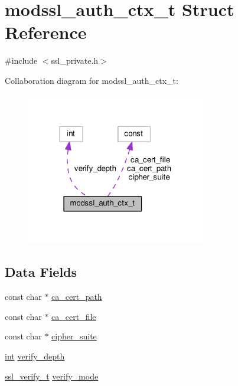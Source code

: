 \hypertarget{structmodssl__auth__ctx__t}{}\section{modssl\+\_\+auth\+\_\+ctx\+\_\+t Struct Reference}
\label{structmodssl__auth__ctx__t}


{\ttfamily \#include $<$ssl\+\_\+private.\+h$>$}



Collaboration diagram for modssl\+\_\+auth\+\_\+ctx\+\_\+t\+:
\nopagebreak
\begin{figure}[H]
\begin{center}
\leavevmode
\includegraphics[width=223pt]{structmodssl__auth__ctx__t__coll__graph}
\end{center}
\end{figure}
\subsection*{Data Fields}
\begin{DoxyCompactItemize}
\item 
const char $\ast$ \hyperlink{structmodssl__auth__ctx__t_ab6907818bc85062a28c931d99f981ca7}{ca\+\_\+cert\+\_\+path}
\item 
const char $\ast$ \hyperlink{structmodssl__auth__ctx__t_aa580f3c2ed5fc2c7d9cf48cf95ef836c}{ca\+\_\+cert\+\_\+file}
\item 
const char $\ast$ \hyperlink{structmodssl__auth__ctx__t_a9cabbc8c6b3b2b002f73b3add389ab96}{cipher\+\_\+suite}
\item 
\hyperlink{pcre_8txt_a42dfa4ff673c82d8efe7144098fbc198}{int} \hyperlink{structmodssl__auth__ctx__t_ab1486d9b2a656743afb44f3fc70401d5}{verify\+\_\+depth}
\item 
\hyperlink{group__MOD__SSL__PRIVATE_ga5473d623bb868c0030b9d21ff13b04f5}{ssl\+\_\+verify\+\_\+t} \hyperlink{structmodssl__auth__ctx__t_a47d63b1be7c8c677b90d2787f0f8dc00}{verify\+\_\+mode}
\end{DoxyCompactItemize}


